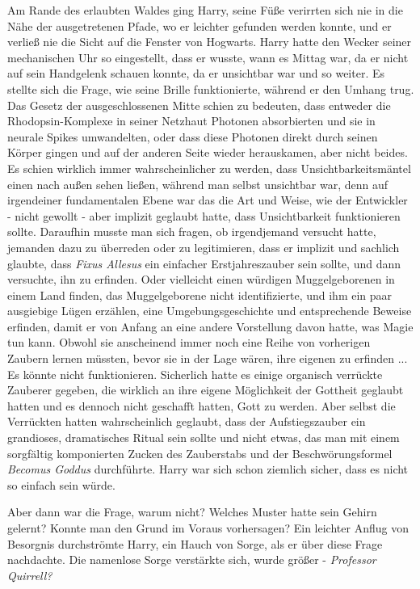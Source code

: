 Am Rande des erlaubten Waldes ging Harry, seine Füße verirrten sich nie in die
Nähe der ausgetretenen Pfade, wo er leichter gefunden werden konnte, und er
verließ nie die Sicht auf die Fenster von Hogwarts. Harry hatte den Wecker
seiner mechanischen Uhr so eingestellt, dass er wusste, wann es Mittag war, da
er nicht auf sein Handgelenk schauen konnte, da er unsichtbar war und so weiter.
Es stellte sich die Frage, wie seine Brille funktionierte, während er den Umhang
trug. Das Gesetz der ausgeschlossenen Mitte schien zu bedeuten, dass entweder
die Rhodopsin-Komplexe in seiner Netzhaut Photonen absorbierten und sie in
neurale Spikes umwandelten, oder dass diese Photonen direkt durch seinen Körper
gingen und auf der anderen Seite wieder herauskamen, aber nicht beides. Es
schien wirklich immer wahrscheinlicher zu werden, dass Unsichtbarkeitsmäntel
einen nach außen sehen ließen, während man selbst unsichtbar war, denn auf
irgendeiner fundamentalen Ebene war das die Art und Weise, wie der Entwickler -
nicht gewollt - aber implizit geglaubt hatte, dass Unsichtbarkeit funktionieren
sollte. Daraufhin musste man sich fragen, ob irgendjemand versucht hatte,
jemanden dazu zu überreden oder zu legitimieren, dass er implizit und sachlich
glaubte, dass \emph{Fixus Allesus} ein einfacher Erstjahreszauber sein sollte,
und dann versuchte, ihn zu erfinden. Oder vielleicht einen würdigen
Muggelgeborenen in einem Land finden, das Muggelgeborene nicht identifizierte,
und ihm ein paar ausgiebige Lügen erzählen, eine Umgebungsgeschichte und
entsprechende Beweise erfinden, damit er von Anfang an eine andere Vorstellung
davon hatte, was Magie tun kann. Obwohl sie anscheinend immer noch eine Reihe
von vorherigen Zaubern lernen müssten, bevor sie in der Lage wären, ihre eigenen
zu erfinden ... Es könnte nicht funktionieren. Sicherlich hatte es einige
organisch verrückte Zauberer gegeben, die wirklich an ihre eigene Möglichkeit
der Gottheit geglaubt hatten und es dennoch nicht geschafft hatten, Gott zu
werden. Aber selbst die Verrückten hatten wahrscheinlich geglaubt, dass der
Aufstiegszauber ein grandioses, dramatisches Ritual sein sollte und nicht etwas,
das man mit einem sorgfältig komponierten Zucken des Zauberstabs und der
Beschwörungsformel \emph{Becomus Goddus} durchführte. Harry war sich schon
ziemlich sicher, dass es nicht so einfach sein würde.

Aber dann war die Frage, warum nicht? Welches Muster hatte sein Gehirn gelernt?
Konnte man den Grund im Voraus vorhersagen? Ein leichter Anflug von Besorgnis
durchströmte Harry, ein Hauch von Sorge, als er über diese Frage nachdachte. Die
namenlose Sorge verstärkte sich, wurde größer - \emph{Professor Quirrell?}

